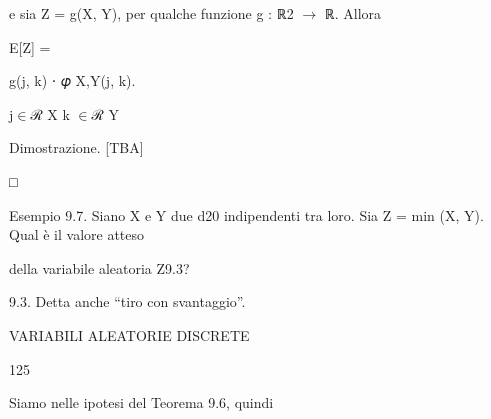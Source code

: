\documentclass[a4paper,portrait,12pt]{article}
\begin{document}
\begin{flushleft}
e sia Z = g(X, Y), per qualche funzione g : ℝ2 $\rightarrow$ ℝ. Allora
\end{flushleft}


\begin{flushleft}
E[Z] =
\end{flushleft}





\begin{flushleft}
g(j, k) ⋅ 𝜑 X,Y(j, k).
\end{flushleft}


\begin{flushleft}
j$\in$ℛ X k $\in$ℛ Y
\end{flushleft}





\begin{flushleft}
Dimostrazione. [TBA]
\end{flushleft}





□





\begin{flushleft}
Esempio 9.7. Siano X e Y due d20 indipendenti tra loro. Sia Z = min (X, Y). Qual \`{e} il valore atteso
\end{flushleft}


\begin{flushleft}
della variabile aleatoria Z9.3?
\end{flushleft}


\begin{flushleft}
9.3. Detta anche {``}tiro con svantaggio''.
\end{flushleft}





\begin{flushleft}
 VARIABILI ALEATORIE DISCRETE
\end{flushleft}





125





\begin{flushleft}
Siamo nelle ipotesi del Teorema 9.6, quindi
\end{flushleft}
\end{document}
